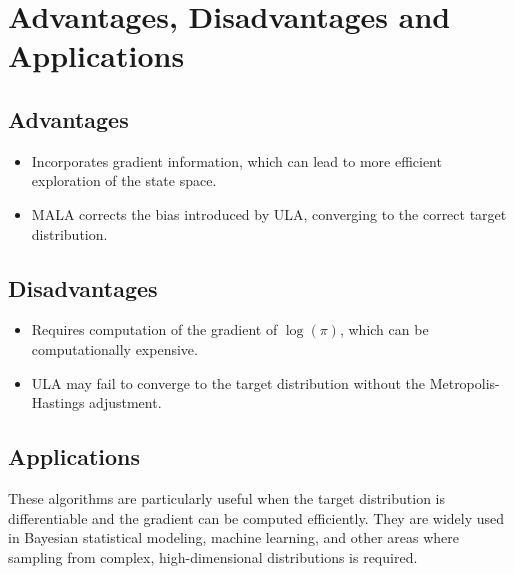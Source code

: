 \documentclass{article}
\begin{document}
\section{Advantages, Disadvantages and Applications}
\subsection{Advantages}
\begin{itemize}
    \item Incorporates gradient information, which can lead to more efficient exploration of the state space.
    \item MALA corrects the bias introduced by ULA, converging to the correct target distribution.
\end{itemize}

\subsection{Disadvantages}
\begin{itemize}
    \item Requires computation of the gradient of \(\log(\pi)\), which can be computationally expensive.
    \item ULA may fail to converge to the target distribution without the Metropolis-Hastings adjustment.
\end{itemize}

\subsection{Applications}
These algorithms are particularly useful when the target distribution is differentiable and the gradient can be computed efficiently. They are widely used in Bayesian statistical modeling, machine learning, and other areas where sampling from complex, high-dimensional distributions is required.
\end{document}

